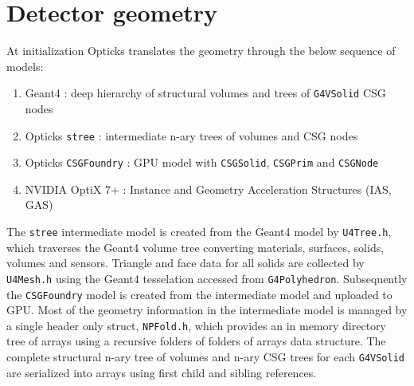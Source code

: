 \documentclass{webofc}
\begin{document}
\section{Detector geometry} 
\label{secgeom}%
At initialization Opticks translates the geometry through the below sequence of models:
%
\begin{enumerate}
\item Geant4 : deep hierarchy of structural volumes and trees of {\tt G4VSolid} CSG nodes
\item Opticks {\tt stree} : intermediate n-ary trees of volumes and CSG nodes
\item Opticks {\tt CSGFoundry} : GPU model with {\tt CSGSolid}, {\tt CSGPrim} and {\tt CSGNode} 
\item NVIDIA OptiX 7+ : Instance and Geometry Acceleration Structures (IAS, GAS)
\end{enumerate}  
%
The {\tt stree} intermediate model is created from the Geant4 model by {\tt U4Tree.h},
which traverses the Geant4 volume tree converting materials, surfaces, solids, volumes and sensors.
Triangle and face data for all solids are collected by {\tt U4Mesh.h} using 
the Geant4 tesselation accessed from {\tt G4Polyhedron}. 
Subsequently the {\tt CSGFoundry} model is created from the intermediate model and uploaded to GPU.   
Most of the geometry information in the intermediate model is managed by a single header only struct, {\tt NPFold.h}, 
which provides an in memory directory tree of arrays using a recursive folders of folders of arrays data structure.
The complete structural n-ary tree of volumes and n-ary CSG trees for each {\tt G4VSolid} 
are serialized into arrays using first child and sibling references.
\end{document}
